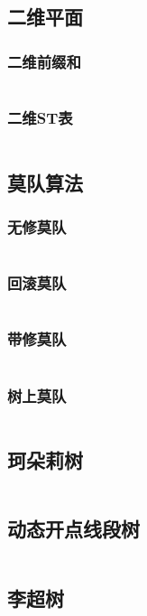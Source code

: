 \documentclass[a4paper,11pt]{article}
\begin{document}
\subsection{二维平面} 
\subsubsection{二维前缀和} 
\inputminted[breaklines]{c++}{数据结构/二维前缀和.cpp}
\subsubsection{二维ST表} 
\inputminted[breaklines]{c++}{数据结构/二维ST表.cpp}

\subsection{莫队算法} 
\subsubsection{无修莫队} 
\inputminted[breaklines]{c++}{数据结构/无修莫队.cpp}

\subsubsection{回滚莫队} 
\inputminted[breaklines]{c++}{数据结构/回滚莫队.cpp}

\subsubsection{带修莫队} 
\inputminted[breaklines]{c++}{数据结构/带修莫队.cpp}

\subsubsection{树上莫队} 
\inputminted[breaklines]{c++}{数据结构/树上莫队.cpp}

\subsection{珂朵莉树}
\inputminted[breaklines]{c++}{数据结构/珂朵莉树.cpp}

\subsection{动态开点线段树}
\inputminted[breaklines]{c++}{数据结构/动态开点线段树.cpp}

\subsection{李超树}
\inputminted[breaklines]{c++}{数据结构/李超树.cpp}
\end{document}
